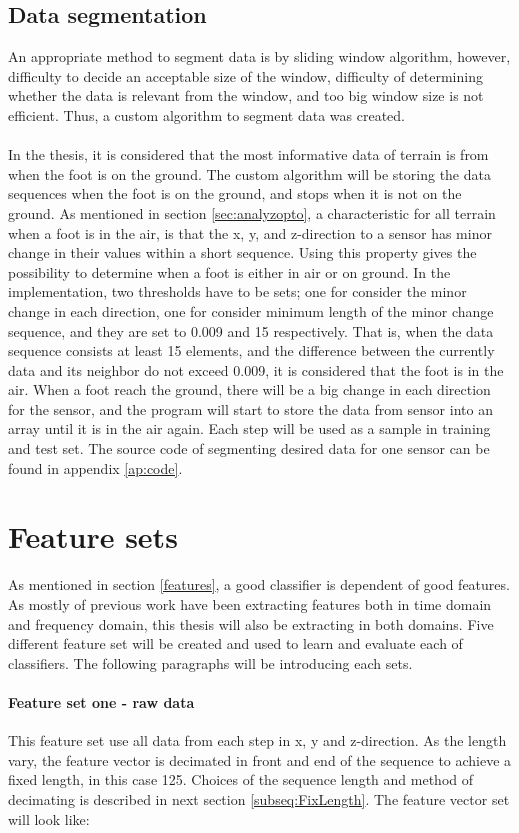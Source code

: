 \documentclass[USenglish]{ifimaster}  %
\begin{document}
\subsection{Data segmentation} \label{subseq:segmentation}
An appropriate method to segment data is by sliding window algorithm, however, difficulty to decide an acceptable size of the window, difficulty of determining whether the data is relevant from the window, and too big window size is not efficient. Thus, a custom algorithm to segment data was created. 
\\
\\
In the thesis, it is considered that the most informative data of terrain is from when the foot is on the ground. The custom algorithm will be storing the data sequences when the foot is on the ground, and stops when it is not on the ground. As mentioned in section \ref{sec:analyzopto}, a characteristic for all terrain when a foot is in the air, is that the x, y, and z-direction to a sensor has minor change in their values within a short sequence. Using this property gives the possibility to determine when a foot is either in air or on ground. In the implementation, two thresholds have to be sets; one for consider the minor change in each direction, one for consider minimum length of the minor change sequence, and they are set to 0.009 and 15 respectively. That is, when the data sequence consists at least 15 elements, and the difference between the currently data and its neighbor do not exceed 0.009, it is considered that the foot is in the air. When a foot reach the ground, there will be a big change in each direction for the sensor, and the program will start to store the data from sensor into an array until it is in the air again. Each step will be used as a sample in training and test set. The source code of segmenting desired data for one sensor can be found in appendix \ref{ap:code}.

\section{Feature sets}\label{sec:featuresets}
As mentioned in section \ref{features}, a good classifier is dependent of good features. As mostly of previous work have been extracting features both in time domain and frequency domain, this thesis will also be extracting in both domains. Five different feature set will be created and used to learn and evaluate each of classifiers. The following paragraphs will be introducing each sets.

\paragraph{Feature set one - raw data} 
This feature set use all data from each step in x, y and z-direction. As the length vary, the feature vector is decimated in front and end of the sequence to achieve a fixed length, in this case 125.  Choices of the sequence length and method of decimating is described in next section \ref{subseq:FixLength}. The feature vector set will look like:
	
\end{document}
